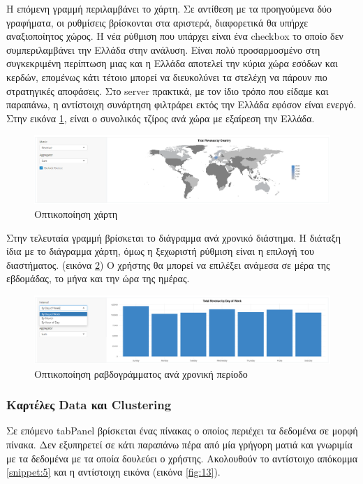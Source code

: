\documentclass{article}
\begin{document}
Η επόμενη γραμμή περιλαμβάνει το χάρτη. Σε αντίθεση με τα προηγούμενα δύο γραφήματα, οι ρυθμίσεις βρίσκονται στα αριστερά, διαφορετικά θα υπήρχε αναξιοποίητος χώρος. Η νέα ρύθμιση που υπάρχει είναι ένα checkbox το οποίο δεν συμπεριλαμβάνει την Ελλάδα στην ανάλυση. Είναι πολύ προσαρμοσμένο στη συγκεκριμένη περίπτωση μιας και η Ελλάδα αποτελεί την κύρια χώρα εσόδων και κερδών, επομένως κάτι τέτοιο μπορεί να διευκολύνει τα στελέχη να πάρουν πιο στρατηγικές αποφάσεις. Στο server πρακτικά, με τον ίδιο τρόπο που είδαμε και παραπάνω, η αντίστοιχη συνάρτηση φιλτράρει εκτός την Ελλάδα εφόσον είναι ενεργό. Στην εικόνα \ref{fig:11}, είναι ο συνολικός τζίρος ανά χώρα με εξαίρεση την Ελλάδα.

\begin{figure}[h]
    \centering
    \includegraphics[width=\textwidth]{pictures/11_map_visual.png}
    \caption{Οπτικοποίηση χάρτη}
    \label{fig:11}
\end{figure}

Στην τελευταία γραμμή βρίσκεται το διάγραμμα ανά χρονικό διάστημα. Η διάταξη ίδια με το διάγραμμα χάρτη, όμως η ξεχωριστή ρύθμιση είναι η επιλογή του διαστήματος. (εικόνα \ref{fig:12}) Ο χρήστης θα μπορεί να επιλέξει ανάμεσα σε μέρα της εβδομάδας, το μήνα και την ώρα της ημέρας.

\begin{figure}[h]
    \centering
    \includegraphics[width=\textwidth]{pictures/12_timebar_visual.png}
    \caption{Οπτικοποίηση ραβδογράμματος ανά χρονική περίοδο}
    \label{fig:12}
\end{figure}

\subsubsection{Καρτέλες Data και Clustering}

Σε επόμενο tabPanel βρίσκεται ένας πίνακας ο οποίος περιέχει τα δεδομένα σε μορφή πίνακα. Δεν εξυπηρετεί σε κάτι παραπάνω πέρα από μία γρήγορη ματιά και γνωριμία με τα δεδομένα με τα οποία δουλεύει ο χρήστης. Ακολουθούν το αντίστοιχο απόκομμα \ref{snippet:5} και η αντίστοιχη εικόνα (εικόνα \ref{fig:13}). 
\end{document}
